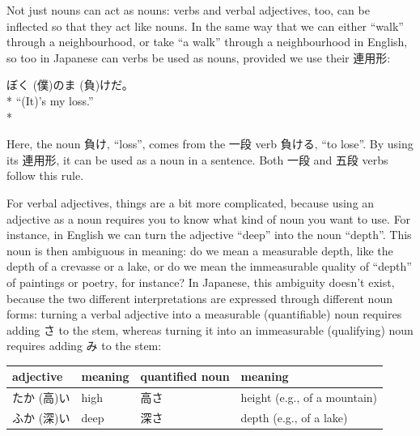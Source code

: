 \documentclass[11pt, b5paper, twoside, openright, onecolumn]{book}
\makeatletter
\newcommand*{\rtrubystack}[2]{{\relscale{0.5}%
  \begin{tabular}[b]{@{}c@{}}%
    {#1}\\%
    {\textscale{2}{#2}}%
  \end{tabular}}%
}
\DeclareRobustCommand*{\rtruby}[2]{%
  \mbox{%
    \setlength{\parskip}{0ex}%
    \BeginAccSupp{method=pdfstringdef,ActualText={#1}}%
      \rtrubystack{\phantom{#2}}{#1}%
      \llap{%
        \rtrubystack{#2}{\phantom{#1}}%
      }%
    \EndAccSupp{}%
  }%
}
\newcommand*{\rubystack}[2]{{\relscale{0.5}%
  \begin{tabular}[b]{@{}c@{}}%
    {#1}\\%
   {\textscale{2}{#2}}%
  \end{tabular}}%
}
\DeclareRobustCommand*{\ruby}[2]{%
  \mbox{%
    \setlength{\parskip}{0ex}%
    \BeginAccSupp{method=pdfstringdef,ActualText={#1}}%
      \rubystack{\phantom{#2}}{#1}%
      \llap{%
        \rubystack{#2}{\phantom{#1}}%
      }%
    \EndAccSupp{}%
  }%
}
\renewcommand*{\rtruby}[2]{#2 (#1)}%
\renewcommand*{\ruby}[2]{#2 (#1)}%
\newenvironment{exampleblock}{
\setlength{\parindent}{0.6in}
\begin{minipage}[t]{\dimexpr\textwidth-\parindent}}
{\end{minipage}}
\newenvironment{mytabularcentered}[1]{\noindent
\begin{center}\begin{tabular}[h]{#1}}{\end{tabular}\end{center}}
\makeatother
\begin{document}
Not just nouns can act as nouns: verbs and verbal adjectives‚ too‚ can be inflected so that they act like nouns. In the same way that we can either “walk” through a neighbourhood‚ or take “a walk” through a neighbourhood in English‚ so too in Japanese can verbs be used as nouns‚ provided we use their 連用形:

\vspace{0.4cm}
\begin{exampleblock}
\ruby{僕}{ぼく}の\ruby{負}{ま}けだ。 \\* 
“(It)’s my loss.” \\* 
\end{exampleblock}
\vspace{0.2cm}

Here‚ the noun 負け‚ “loss”‚ comes from the 一段 verb 負ける‚ “to lose”. By using its 連用形‚ it can be used as a noun in a sentence. Both 一段 and 五段 verbs follow this rule.

For verbal adjectives‚ things are a bit more complicated‚ because using an adjective as a noun requires you to know what kind of noun you want to use. For instance‚ in English we can turn the adjective “deep” into the noun “depth”. This noun is then ambiguous in meaning: do we mean a measurable depth‚ like the depth of a crevasse or a lake‚ or do we mean the immeasurable quality of “depth” of paintings or poetry‚ for instance? In Japanese‚ this ambiguity doesn’t exist‚ because the two different interpretations are expressed through different noun forms: turning a verbal adjective into a measurable (quantifiable) noun requires adding さ to the stem‚ whereas turning it into an immeasurable (qualifying) noun requires adding み to the stem:

\vspace{0.5cm}
\smaller
\begin{center}
\begin{mytabularcentered}{| l  l  l  l |}\hline 
\rule{0pt}{2.4ex}adjective & meaning & \index[english]{Noun forms!quantified noun}quantified noun & meaning\\ 
\hline
\rule{0pt}{3.6ex}\rtruby{高}{たか}い & high & 高さ & height (e.g.‚ of a mountain)\\ 
\rule{0pt}{3.6ex}\rtruby{深}{ふか}い & deep & 深さ & depth (e.g.‚ of a lake)\\ 
\hline 
\end{mytabularcentered}
\end{center}
\larger
\vspace{0.5cm}
\end{document}
